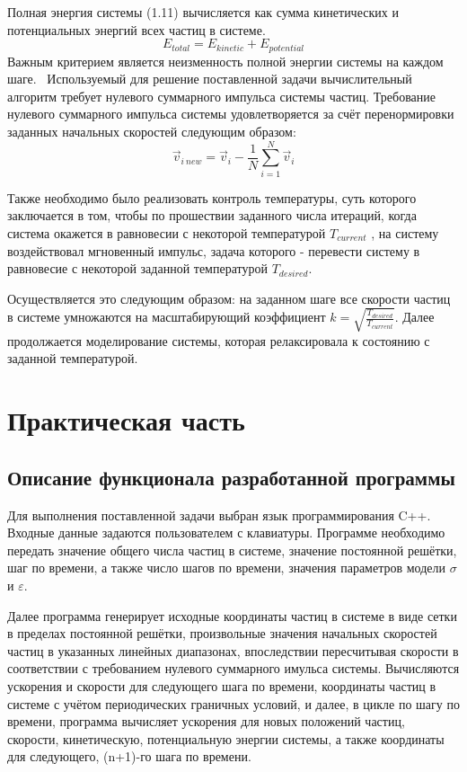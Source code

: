 \documentclass[14pt,a4paper,report]{ncc}
\begin{document}
Полная энергия системы (1.11) вычисляется как сумма кинетических и потенциальных энергий всех частиц в системе.
\begin{equation}
E_{total}=E_{kinetic}+E_{potential}
\end{equation}
Важным критерием является неизменность полной энергии системы на каждом шаге.
\ 
Используемый для решение поставленной задачи вычислительный алгоритм требует нулевого суммарного импульса системы частиц.
Требование нулевого суммарного импульса системы удовлетворяется за счёт перенормировки заданных начальных скоростей следующим образом:
\begin{equation}
\vec{v}_{{i} \ new} = \vec{v}_i - {\frac{1}{N}}\sum\limits_{i=1}^N \vec{v}_i
\end{equation}

Также необходимо было реализовать контроль температуры, суть которого заключается в том, чтобы по прошествии заданного числа итераций, когда система окажется в равновесии с некоторой температурой $T_{current}$ , на систему воздействовал мгновенный импульс, задача которого - перевести систему в равновесие с некоторой заданной температурой $T_{desired}$. 
\ 

Осуществляется это следующим образом: на заданном шаге все скорости частиц в системе умножаются на масштабирующий коэффициент $k=\sqrt{\frac{T_{desired}}{T_{current}}}$. Далее продолжается моделирование системы, которая релаксировала к состоянию с заданной температурой.
\newpage\section{Практическая часть}
\subsection{Описание функционала разработанной программы}
Для выполнения поставленной задачи выбран язык программирования C++. Входные данные задаются пользователем с клавиатуры. Программе необходимо передать значение общего числа частиц в системе, значение постоянной решётки, шаг по времени, а также число шагов по времени, значения параметров модели $\sigma$ и $\varepsilon$.
\

Далее программа генерирует исходные координаты частиц в системе в виде сетки в пределах постоянной решётки, произвольные значения начальных скоростей частиц в указанных линейных диапазонах, впоследствии пересчитывая скорости в соответствии с требованием нулевого суммарного имульса системы. Вычисляются ускорения и скорости для следующего шага по времени, координаты частиц в системе с учётом периодических граничных условий, и далее, в цикле по шагу по времени, программа вычисляет ускорения для новых положений частиц, скорости, кинетическую, потенциальную энергии системы, а также координаты для следующего, (n+1)-го шага по времени.
\
\end{document}
